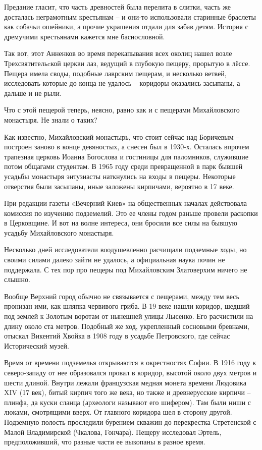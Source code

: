 Предание гласит, что часть древностей была перелита в слитки, часть же досталась неграмотным крестьянам – и они-то использовали старинные браслеты как собачьи ошейники, а прочие украшения отдали для забав детям. История с дремучими крестьянами кажется мне баснословной. 

Так вот, этот Анненков во время перекапывания всех околиц нашел возле Трехсвятительcкой церкви лаз, ведущий в глубокую пещеру, прорытую в лёссе. Пещера имела своды, подобные лаврским пещерам, и несколько ветвей, исследовать которые до конца не удалось – коридоры оказались засыпаны, а дальше и не рыли.

Что с этой пещерой теперь, неясно, равно как и с пещерами Михайловского монастыря. Не знали о таких?

Как известно, Михайловский монастырь, что стоит сейчас над Боричевым – построен заново в конце девяностых, а снесен был в 1930-х. Осталась впрочем трапезная церковь Иоанна Богослова и гостиницы для паломников, служившие потом общагами студентам. В 1965 году среди превращенной в парк бывшей усадьбы монастыря энтузиасты наткнулись на входы в пещеры. Некоторые отверстия были засыпаны, иные заложены кирпичами, вероятно в 17 веке.

При редакции газеты «Вечерний Киев» на общественных началах действовала комиссия по изучению подземелий. Это ее члены годом раньше провели раскопки в Церковщине. И вот на волне интереса, они бросили все силы на бывшую усадьбу Михайловского монастыря.

Несколько дней исследователи воодушевленно расчищали подземные ходы, но своими силами далеко зайти не удалось, а официальная наука почин не поддержала. С тех пор про пещеры под Михайловским Златоверхим ничего не слышно.

Вообще Верхний город обычно не связывается с пещерами, между тем весь пронизан ими, как шляпка червивого гриба. В 19 веке нашли коридор, шедший под землей к Золотым воротам от нынешней улицы Лысенко. Его расчистили на длину около ста метров. Подобный же ход, укрепленный сосновыми бревнами, отыскал Викентий Хвойка в 1908 году в усадьбе Петровского, где сейчас Исторический музей.

Время от времени подземелья открываются в окрестностях Софии. В 1916 году к северо-западу от нее образовался провал в коридор, высотой около двух метров и шести длиной. Внутри лежали французская медная монета времени Людовика XIV (17 век), битый кирпич того же века, но также и древнерусские кирпичи – плинфа, да куски сланца (археологи называют его шифером). Там были ниши с люками, смотрящими вверх. От главного коридора шел в сторону другой. Подземную полость проследили бурением скважин до перекрестка Стретенской с Малой Владимирской (Чкалова, Гончара). Пещеру исследовал Эртель, предположивший, что разные части ее выкопаны в разное время. 

